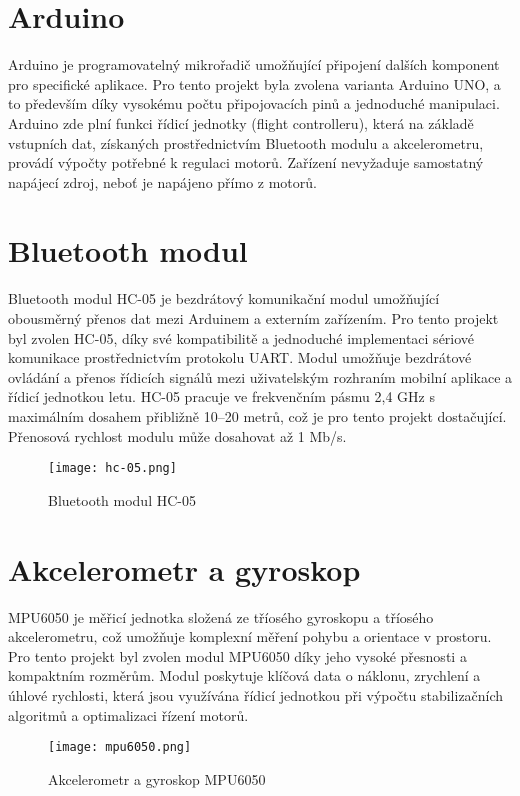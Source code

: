 \documentclass[12pt]{report}
\begin{document}
\section{Arduino}
Arduino je programovatelný mikrořadič umožňující připojení dalších komponent pro specifické aplikace. Pro tento projekt byla zvolena varianta Arduino UNO, a to především díky vysokému počtu připojovacích pinů a jednoduché manipulaci. Arduino zde plní funkci řídicí jednotky (flight controlleru), která na základě vstupních dat, získaných prostřednictvím Bluetooth modulu a akcelerometru, provádí výpočty potřebné k regulaci motorů. Zařízení nevyžaduje samostatný napájecí zdroj, neboť je napájeno přímo z motorů.

\section{Bluetooth modul}
Bluetooth modul HC-05 je bezdrátový komunikační modul umožňující obousměrný přenos dat mezi Arduinem a externím zařízením. Pro tento projekt byl zvolen HC-05, díky své kompatibilitě a jednoduché implementaci sériové komunikace prostřednictvím protokolu UART. Modul umožňuje bezdrátové ovládání a přenos řídicích signálů mezi uživatelským rozhraním mobilní aplikace a řídicí jednotkou letu. HC-05 pracuje ve frekvenčním pásmu 2,4 GHz s maximálním dosahem přibližně 10–20 metrů, což je pro tento projekt dostačující. Přenosová rychlost modulu může dosahovat až 1 Mb/s. 
\begin{figure}[H]
	\centering
	\texttt{[image: hc-05.png]}
	\caption{Bluetooth modul HC-05}
	\label{fig:hc-05.png}
\end{figure}
\section{Akcelerometr a gyroskop}
MPU6050 je měřicí jednotka složená ze tříosého gyroskopu a tříosého akcelerometru, což umožňuje komplexní měření pohybu a orientace v prostoru. Pro tento projekt byl zvolen modul MPU6050 díky jeho vysoké přesnosti a kompaktním rozměrům. Modul poskytuje klíčová data o náklonu, zrychlení a úhlové rychlosti, která jsou využívána řídicí jednotkou při výpočtu stabilizačních algoritmů a optimalizaci řízení motorů.
\begin{figure}[H]
	\centering
	\texttt{[image: mpu6050.png]}
	\caption{Akcelerometr a gyroskop MPU6050}
	\label{fig:hc-05.png}
\end{figure}
\end{document}

